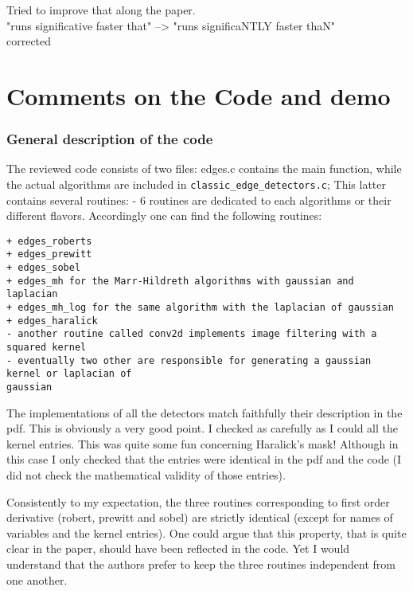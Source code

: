 \documentclass[a4paper,10pt]{report}
\begin{document}
\ans Tried to improve that along the paper.\\

\que "runs significative faster that" --> "runs significaNTLY faster thaN"\\

\ans corrected\\

\section{ Comments on the Code and demo}

\subsubsection{General description of the code}
The reviewed code consists of two files: edges.c contains the main function,
while the actual algorithms are included in \verb+classic_edge_detectors.c+; This
latter contains several routines:
- 6 routines are dedicated to each algorithms or their different flavors.
Accordingly one can find the following routines:
\begin{verbatim}
+ edges_roberts
+ edges_prewitt
+ edges_sobel
+ edges_mh for the Marr-Hildreth algorithms with gaussian and laplacian
+ edges_mh_log for the same algorithm with the laplacian of gaussian
+ edges_haralick
- another routine called conv2d implements image filtering with a squared kernel
- eventually two other are responsible for generating a gaussian kernel or laplacian of
gaussian
\end{verbatim}


The implementations of all the detectors match faithfully their description in
the pdf. This is obviously a very good point. I checked as carefully as I could
all the kernel entries. This was quite some fun concerning Haralick's mask!
Although in this case I only checked that the entries were identical in the pdf
and the code (I did not check the mathematical validity of those entries).

\que Consistently to my expectation, the three routines corresponding to first order
derivative (robert, prewitt and sobel) are strictly identical (except for
names of variables and the kernel entries). One could argue that this property,
that is quite clear in the paper, should have been reflected in the code. Yet I
would understand that the authors prefer to keep the three routines independent
from one another.\\
\end{document}
